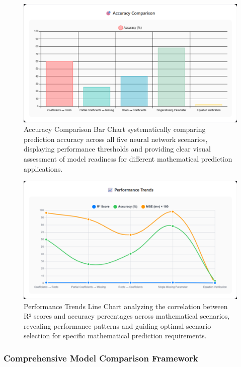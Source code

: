 \documentclass[11pt,a4paper]{report}
\begin{document}
\begin{figure}[H]
\centering
\includegraphics[width=\textwidth]{quadratic_predictor_accuracy_comparison.png}
\caption{Accuracy Comparison Bar Chart systematically comparing prediction accuracy across all five neural network scenarios, displaying performance thresholds and providing clear visual assessment of model readiness for different mathematical prediction applications.}
\label{fig:quadratic_accuracy}
\end{figure}

\begin{figure}[H]
\centering
\includegraphics[width=\textwidth]{quadratic_predictor_performance_trends.png}
\caption{Performance Trends Line Chart analyzing the correlation between R² scores and accuracy percentages across mathematical scenarios, revealing performance patterns and guiding optimal scenario selection for specific mathematical prediction requirements.}
\label{fig:quadratic_trends}
\end{figure}

\subsubsection{Comprehensive Model Comparison Framework}
\end{document}
